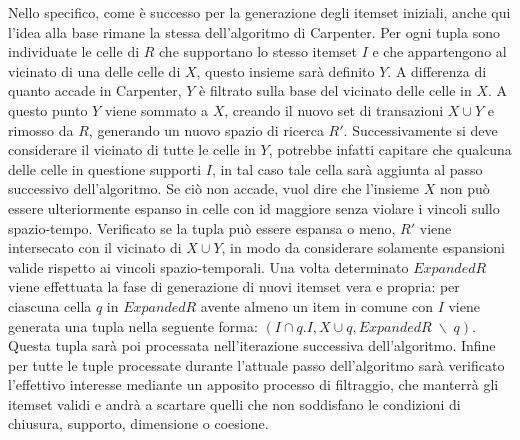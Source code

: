 Nello specifico, come è successo per la generazione degli itemset iniziali, anche qui l'idea alla base rimane la stessa dell'algoritmo di Carpenter.
Per ogni tupla sono individuate le celle di \(R\) che supportano lo stesso itemset \(I\) e che appartengono al vicinato di una delle celle di \(X\), questo insieme sarà definito \(Y\).
A differenza di quanto accade in Carpenter, \(Y\) è filtrato sulla base del vicinato delle celle in \(X\).
A questo punto \(Y\) viene sommato a \(X\), creando il nuovo set di transazioni \(X \cup Y\) e rimosso da \(R\), generando un nuovo spazio di ricerca \(R'\).
Successivamente si deve considerare il vicinato di tutte le celle in \(Y\), potrebbe infatti capitare che qualcuna delle celle in questione supporti \(I\), in tal caso tale cella sarà aggiunta al passo successivo dell'algoritmo.
Se ciò non accade, vuol dire che l'insieme \(X\) non può essere ulteriormente espanso in celle con id maggiore senza violare i vincoli sullo spazio-tempo.
Verificato se la tupla può essere espansa o meno, \(R'\) viene intersecato con il vicinato di \( X \cup Y\), in modo da considerare solamente espansioni valide rispetto ai vincoli spazio-temporali.
Una volta determinato \(ExpandedR\) viene effettuata la fase di generazione di nuovi itemset vera e propria: per ciascuna cella \(q\) in \(ExpandedR\) avente almeno un item in comune con \(I\) viene generata una tupla nella seguente forma: \((I \cap q.I, X \cup q, ExpandedR \;  \backslash \; q )\).
Questa tupla sarà poi processata nell'iterazione successiva dell'algoritmo.
Infine per tutte le tuple processate durante l'attuale passo dell'algoritmo sarà verificato l'effettivo interesse mediante un apposito processo di filtraggio, che manterrà gli itemset validi e andrà a scartare quelli che non soddisfano le condizioni di chiusura, supporto, dimensione o coesione.

